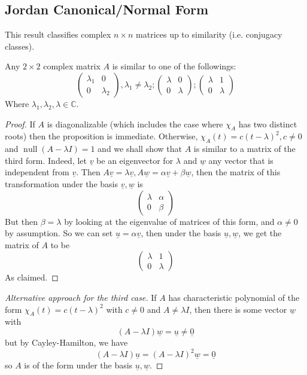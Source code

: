 \subsection{Jordan Canonical/Normal Form}
This result classifies complex $n\times n$ matrices up to similarity (i.e. conjugacy classes).
\begin{proposition}
    Any $2\times 2$ complex matrix $A$ is similar to one of the followings:
    $$
    \begin{pmatrix}
        \lambda_1&0\\
        0&\lambda_2
    \end{pmatrix},\lambda_1\neq\lambda_2;
    \begin{pmatrix}
        \lambda&0\\
        0&\lambda
    \end{pmatrix};
    \begin{pmatrix}
        \lambda&1\\
        0&\lambda
    \end{pmatrix}
    $$
    Where $\lambda_1,\lambda_2,\lambda\in\mathbb C$.
\end{proposition}
\begin{proof}
    If $A$ is diagonalizable (which includes the case where $\chi_A$ has two distinct roots) then the proposition is immediate.
    Otherwise, $\chi_A(t)=c(t-\lambda)^2,c\neq 0$ and $\operatorname{null}(A-\lambda I)=1$ and we shall show that $A$ is similar to a matrix of the third form.
    Indeed, let $\underline{v}$ be an eigenvector for $\lambda$ and $\underline{w}$ any vector that is independent from $\underline{v}$.
    Then $A\underline{v}=\lambda\underline{v},A\underline{w}=\alpha\underline{v}+\beta\underline{w}$, then the matrix of this transformation under the basis $\underline{v},\underline{w}$ is
    $$\begin{pmatrix}
        \lambda&\alpha\\
        0&\beta
    \end{pmatrix}$$
    But then $\beta=\lambda$ by looking at the eigenvalue of matrices of this form, and $\alpha\neq 0$ by assumption.
    So we can set $\underline{u}=\alpha\underline{v}$, then under the basis $\underline{u},\underline{w}$, we get the matrix of $A$ to be
    $$\begin{pmatrix}
        \lambda&1\\
        0&\lambda
    \end{pmatrix}$$
    As claimed.
\end{proof}
\begin{proof}[Alternative approach for the third case]
    If $A$ has characteristic polynomial of the form $\chi_A(t)=c(t-\lambda)^2$ with $c\neq 0$ and $A\neq \lambda I$, then there is some vector $\underline{w}$ with
    $$(A-\lambda I)\underline{w}=\underline{u}\neq\underline{0}$$
    but by Cayley-Hamilton, we have
    $$(A-\lambda I)\underline{u}=(A-\lambda I)^2\underline{w}=\underline{0}$$
    so $A$ is of the form under the basis $\underline{u},\underline{w}$.
\end{proof}
